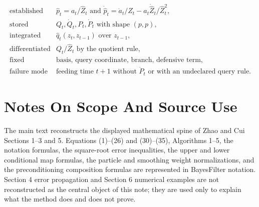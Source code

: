 \documentclass[11pt]{article}
\begin{document}
\[
\begin{array}{ll}
\text{established} &
    \widehat p_t=a_t/\widehat Z_t
    \text{ and }
    \dot{\widehat p}_t=\dot a_t/\widehat Z_t
    -a_t\dot{\widehat Z}_t/\widehat Z_t^2,\\[1mm]
\text{stored} &
    Q_t,\dot Q_t,P_t,\dot P_t
    \text{ with shape }(p,p),\\[1mm]
\text{integrated} &
    \widehat q_t(z_t,z_{t-1}) \text{ over } z_{t-1},\\[1mm]
\text{differentiated} &
    Q_t/\widehat Z_t \text{ by the quotient rule},\\[1mm]
\text{fixed} &
    \text{basis, query coordinate, branch, defensive term},\\[1mm]
\text{failure mode} &
    \text{feeding time }t+1\text{ without }\dot P_t
    \text{ or with an undeclared query rule.}
\end{array}
\label{eq:p24-p22-r4}
\]

\appendix
\section{Notes On Scope And Source Use}

The main text reconstructs the displayed mathematical spine of Zhao and Cui \cite{zhao2024ttsequential}
Sections 1--3 and 5.  Equations (1)--(26) and (30)--(35), Algorithms 1--5,
the notation formulas, the square-root error inequalities, the upper and lower
conditional map formulas, the particle and smoothing weight normalizations, and
the preconditioning composition formulas are represented in BayesFilter
notation.  Section 4 error propagation and Section 6 numerical examples are
not reconstructed as the central object of this note; they are used only to
explain what the method does and does not prove.



\end{document}
